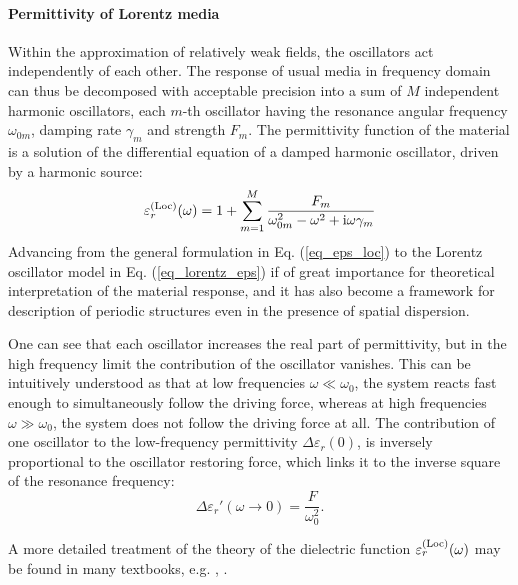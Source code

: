 \paragraph{Permittivity of Lorentz media} Within the approximation of relatively weak fields, the oscillators act independently of each other.
The response of usual media in frequency domain can thus be decomposed with acceptable precision into a sum of $M$ independent harmonic oscillators, each $m$-th oscillator having the resonance angular frequency $\omega_{0m}$, damping rate $\gamma_m$ and strength $F_m$.
The permittivity function of the material is a solution of the differential equation of a damped harmonic oscillator, driven by a harmonic source:
\begin{equation} \varepsilon^{\rm(Loc)}_r(\omega) = 1 + \sum_{m=1}^M \frac{F_m}{\omega_{0m}^2 - \omega^2 + {\mathrm i}\omega\gamma_m} \label{eq_lorentz_eps}\end{equation} %
Advancing from the general formulation in Eq. (\ref{eq_eps_loc}) to the Lorentz oscillator model in Eq. (\ref{eq_lorentz_eps}) if of great importance for theoretical interpretation of the material response, and it has also become a framework for description of periodic structures even in the presence of spatial dispersion. 

One can see that each oscillator increases the real part of permittivity, but in the high frequency limit the contribution of the oscillator vanishes. This can be intuitively understood as that at low frequencies $\omega \ll \omega_0$, the system reacts fast enough to simultaneously follow the driving force, whereas at high frequencies  $\omega \gg \omega_0$, the system does not follow the driving force at all.
The contribution of one oscillator to the low-frequency permittivity $\Delta\varepsilon_r(0)$, is inversely proportional to the oscillator restoring force, which links it to the inverse square of the resonance frequency:
\begin{equation} \Delta \varepsilon_r'(\omega\rightarrow0) = \frac{F}{\omega_0^{2}}.  \label{eq_delta_eps} \end{equation}

A more detailed treatment of the theory of the dielectric function $\varepsilon^{\rm(Loc)}_r(\omega)$ may be found in many textbooks, e.g. \cite[p. 454]{klingshirn2007semiconductor}, \cite{dresselhaus1966optical}. 


